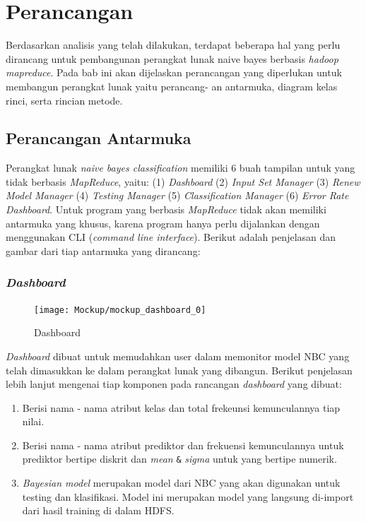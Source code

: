 \chapter{Perancangan}
Berdasarkan analisis yang telah dilakukan, terdapat beberapa hal yang perlu dirancang untuk pembangunan perangkat lunak naive bayes berbasis \textit{hadoop mapreduce}. Pada bab ini akan dijelaskan perancangan yang diperlukan untuk membangun perangkat lunak yaitu perancang-
an antarmuka, diagram kelas rinci, serta rincian metode.
			
\section{Perancangan Antarmuka}
\label{sec:Perancangan Antarmuka}

Perangkat lunak \textit{naive bayes classification} memiliki 6 buah tampilan untuk yang tidak berbasis \textit{MapReduce}, yaitu: (1) \textit{Dashboard} (2) \textit{Input Set Manager} (3) \textit{Renew Model Manager} (4) \textit{Testing Manager} (5) \textit{Classification Manager} (6) \textit{Error Rate Dashboard}. Untuk program yang berbasis \textit{MapReduce} tidak akan memiliki antarmuka yang khusus, karena program hanya perlu dijalankan dengan menggunakan CLI (\textit{command line interface}). Berikut adalah penjelasan dan gambar dari tiap antarmuka yang dirancang:

\subsection{\textit{Dashboard}}
\label{subsec:Dashboard}

\begin{figure}[H]
	\centering
	\texttt{[image: Mockup/mockup\_dashboard\_0]}
	\caption[input-set-gui-1]{Dashboard}
	\label{fig:input-set-gui-1}
\end{figure}
\textit{Dashboard} dibuat untuk memudahkan user dalam memonitor model NBC yang telah dimasukkan ke dalam perangkat lunak yang dibangun. Berikut penjelasan lebih lanjut mengenai tiap komponen pada rancangan \textit{dashboard} yang dibuat:
\begin{enumerate}
	\item Berisi nama - nama atribut kelas dan total frekeunsi kemunculannya tiap nilai.
	\item Berisi nama - nama atribut prediktor dan frekuensi kemunculannya untuk prediktor bertipe diskrit dan \textit{mean} \verb|&| \textit{sigma} untuk yang bertipe numerik.
	\item \textit{Bayesian model} merupakan model dari NBC yang akan digunakan untuk testing dan klasifikasi. Model ini merupakan model yang langsung di-import dari hasil training di dalam HDFS.
\end{enumerate}

